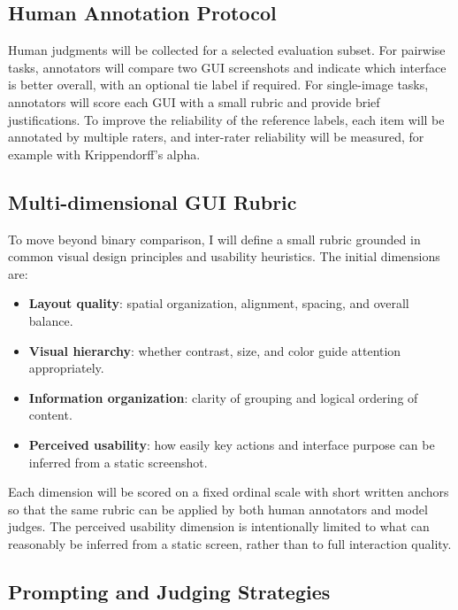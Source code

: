 \documentclass[pdflatex,sn-mathphys-num]{sn-jnl}
\begin{document}
\subsection{Human Annotation Protocol}

Human judgments will be collected for a selected evaluation subset. For pairwise tasks,
annotators will compare two GUI screenshots and indicate which interface is better
overall, with an optional tie label if required. For single-image tasks, annotators
will score each GUI with a small rubric and provide brief justifications. To improve
the reliability of the reference labels, each item will be annotated by multiple
raters, and inter-rater reliability will be measured, for example with
Krippendorff's alpha.

\subsection{Multi-dimensional GUI Rubric}

To move beyond binary comparison, I will define a small rubric grounded in common
visual design principles and usability heuristics. The initial dimensions are:

\begin{itemize}
    \item \textbf{Layout quality}: spatial organization, alignment, spacing, and
    overall balance.
    \item \textbf{Visual hierarchy}: whether contrast, size, and color guide attention
    appropriately.
    \item \textbf{Information organization}: clarity of grouping and logical ordering
    of content.
    \item \textbf{Perceived usability}: how easily key actions and interface purpose
    can be inferred from a static screenshot.
\end{itemize}

Each dimension will be scored on a fixed ordinal scale with short written anchors so
that the same rubric can be applied by both human annotators and model judges. The
perceived usability dimension is intentionally limited to what can reasonably be
inferred from a static screen, rather than to full interaction quality.

\subsection{Prompting and Judging Strategies}
\end{document}

